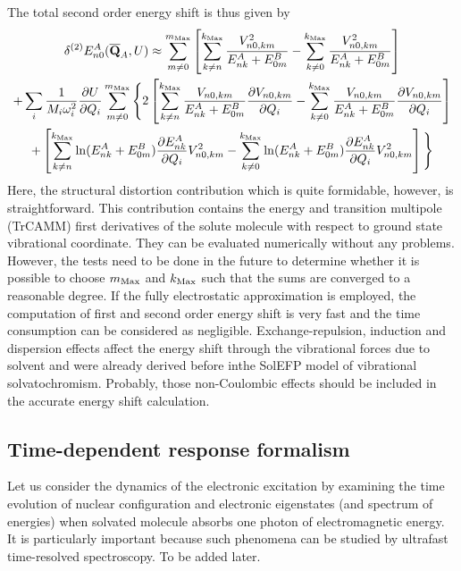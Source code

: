 \documentclass[a4paper,titlepage,twoside,fleqn,12pt]{book}
\newcommand{\fderiv}[2]{\ensuremath{
\frac{\partial #1}{\partial #2}}}
\begin{document}
The total second order energy shift is thus given by
%
\begin{multline}
\delta^{(2)} E^A_{n0}({\bf \overline{Q}}_A, U) \approx 
\sum_{m\ne 0} ^{m_{\rm Max}}
\left[
\sum_{k\ne n} ^{k_{\rm Max}} \frac{ V_{n0,km}^2 }{E^A_{nk} + E^B_{0m}}
%
- \sum_{k\ne 0} ^{k_{\rm Max}} \frac{
V_{n0,km}^2
}{E^A_{nk} + E^B_{0m}}
\right] \\
+
\sum_i \frac{1}{M_i\omega_i^2} \fderiv{U}{Q_i}
\sum_{m\ne 0} ^{m_{\rm Max}}
\Bigg\{
  2 \left[ 
\sum_{k\ne n} ^{k_{\rm Max}} \frac{ V_{n0,km} }{E^A_{nk} + E^B_{0m}} \fderiv{V_{n0,km} }{Q_i}
-
\sum_{k\ne 0} ^{k_{\rm Max}} \frac{ V_{n0,km} }{E^A_{nk} + E^B_{0m}} \fderiv{V_{n0,km} }{Q_i}
\right] \\
+
\left[
\sum_{k\ne n} ^{k_{\rm Max}} \ln (E^A_{nk} + E^B_{0m}) \fderiv{E^A_{nk}}{Q_i} V_{n0,km}^2
-
\sum_{k\ne 0} ^{k_{\rm Max}}  \ln (E^A_{nk} + E^B_{0m}) \fderiv{E^A_{nk}}{Q_i} V_{n0,km}^2
\right]
\Bigg\}
\end{multline}
%
Here, the structural distortion contribution
which is quite formidable, however, is straightforward. 
This contribution contains the energy and 
transition multipole (TrCAMM) first derivatives of the solute molecule with respect to
ground state vibrational coordinate. They can be evaluated
numerically without any problems. However, the tests need to be done in the future
to determine whether it is possible to choose ${m_{\rm Max}}$ and ${k_{\rm Max}}$
such that the sums are converged to a reasonable degree. 
If the fully electrostatic approximation is employed, 
the computation of first and second order energy shift 
is very fast and the time consumption can be considered as negligible.
Exchange\hyp{}repulsion, induction and dispersion effects
affect the energy shift through the vibrational forces
due to solvent and were already derived before
inthe SolEFP model of vibrational solvatochromism. 
Probably, those non\hyp{}Coulombic effects should be included
in the accurate energy shift calculation.



\subsection{Time-dependent response formalism}

Let us consider the dynamics of the electronic excitation 
by examining the time evolution of nuclear configuration and
electronic eigenstates (and spectrum of energies) when solvated molecule absorbs one photon
of electromagnetic energy. It is particularly important because
such phenomena can be studied by ultrafast time-resolved spectroscopy.
To be added later.
\end{document}
